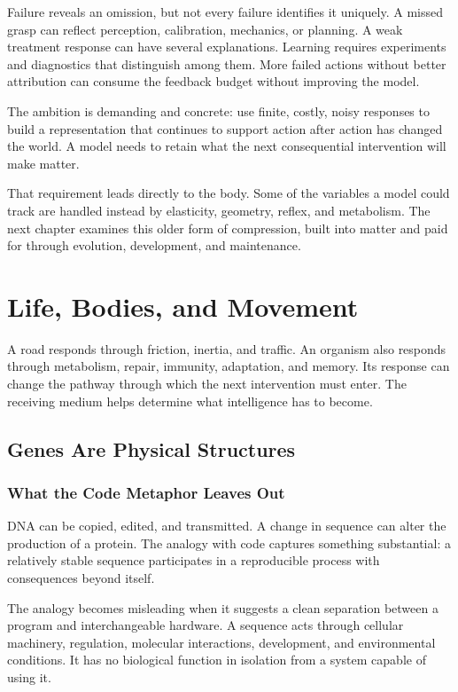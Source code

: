 \documentclass[11pt,openany]{book}
\begin{document}
Failure reveals an omission, but not every failure identifies it uniquely. A missed grasp can reflect perception, calibration, mechanics, or planning. A weak treatment response can have several explanations. Learning requires experiments and diagnostics that distinguish among them. More failed actions without better attribution can consume the feedback budget without improving the model.

The ambition is demanding and concrete: use finite, costly, noisy responses to build a representation that continues to support action after action has changed the world. A model needs to retain what the next consequential intervention will make matter.

That requirement leads directly to the body. Some of the variables a model could track are handled instead by elasticity, geometry, reflex, and metabolism. The next chapter examines this older form of compression, built into matter and paid for through evolution, development, and maintenance.

\chapter{Life, Bodies, and Movement}

A road responds through friction, inertia, and traffic. An organism also responds through metabolism, repair, immunity, adaptation, and memory. Its response can change the pathway through which the next intervention must enter. The receiving medium helps determine what intelligence has to become.

\section{Genes Are Physical Structures}

\subsection{What the Code Metaphor Leaves Out}

DNA can be copied, edited, and transmitted. A change in sequence can alter the production of a protein. The analogy with code captures something substantial: a relatively stable sequence participates in a reproducible process with consequences beyond itself.

The analogy becomes misleading when it suggests a clean separation between a program and interchangeable hardware. A sequence acts through cellular machinery, regulation, molecular interactions, development, and environmental conditions. It has no biological function in isolation from a system capable of using it.
\end{document}
